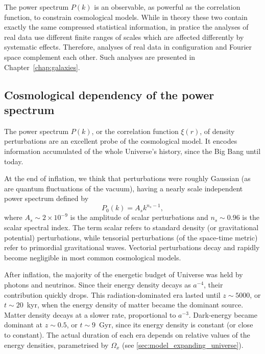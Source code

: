     The power spectrum $P(k)$ is an observable, as powerful as the correlation function,
    to constrain cosmological models. While in theory these two contain exactly the
    same compressed statistical information, 
    in pratice the analyses of real data  
    use different finite ranges of scales 
    which are affected differently by 
    systematic effects. 
    Therefore, analyses of real data in configuration and Fourier space 
    complement each other. 
    Such analyses are presented in Chapter~\ref{chap:galaxies}. 

    \subsection{Cosmological dependency of the power spectrum}
    
    The power spectrum $P(k)$, or the correlation function $\xi(r)$, of density 
    perturbations are an excellent probe of the cosmological model. 
    It encodes information accumulated of the whole Universe's history, since the Big Bang
    until today.

    At the end of inflation, we think that perturbations were roughly Gaussian 
    (as are quantum fluctuations of the vacuum), 
    having a nearly scale independent power spectrum defined by
    \begin{equation}
        P_0(k) = A_s k^{n_s-1},
        \label{eq:initial_power_spectrum}
    \end{equation}
    where $A_s \sim 2 \times 10^{-9}$ is the amplitude of scalar perturbations 
    and $n_s \sim 0.96$ is the scalar spectral index. The term scalar refers to 
    standard density (or gravitational potential) perturbations, 
    while tensorial perturbations (of the space-time metric) refer to 
    primordial gravitational waves. Vectorial perturbations decay and rapidly become
    negligible in most common cosmological models. 

    After inflation, the majority of the energetic budget of Universe was held
    by photons and neutrinos. Since their energy density decays as $a^{-4}$, 
    their contribution quickly drops. This radiation-dominated era lasted until 
    $z \sim 5000$, or $t \sim 20$~kyr, when the energy density of matter became 
    the dominant source. Matter density decays at a slower rate, proportional to $a^{-3}$.
    Dark-energy became dominant at $z \sim 0.5$, or $t \sim 9$~Gyr, since its 
    energy density is constant (or close to constant).  
    The actual duration of each era depends on relative values of 
    the energy densities, parametrised by $\Omega_x$ 
    (see \ref{sec:model_expanding_universe}). 


